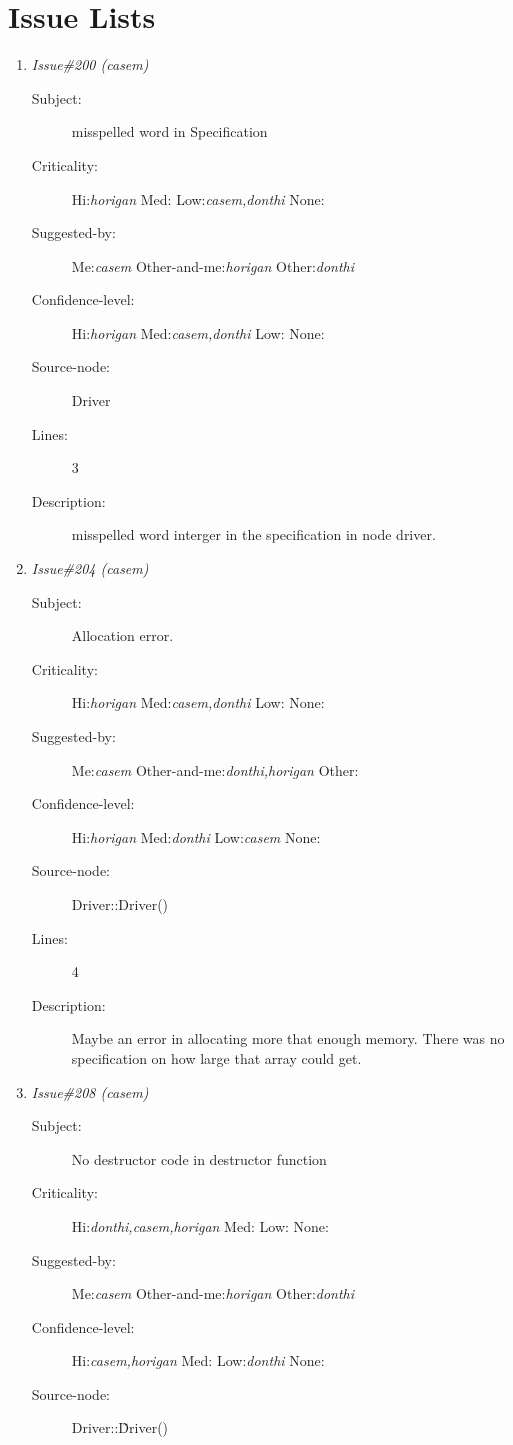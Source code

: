 \section{Issue Lists}
\begin{enumerate}
\item {\it Issue\#200 (casem)}
\begin{description}
\item [Subject:] misspelled word in Specification
\item [Criticality:] Hi:{\it horigan} Med:{\it } Low:{\it casem,donthi} None:{\it }
\item [Suggested-by:] Me:{\it casem} Other-and-me:{\it horigan} Other:{\it donthi}
\item [Confidence-level:] Hi:{\it horigan} Med:{\it casem,donthi} Low:{\it } None:{\it }
\item [Source-node:] Driver

\item [Lines:] 3

\item [Description:] misspelled word interger in the specification
in node driver.
\end{description}
\item {\it Issue\#204 (casem)}
\begin{description}
\item [Subject:] Allocation error.
\item [Criticality:] Hi:{\it horigan} Med:{\it casem,donthi} Low:{\it } None:{\it }
\item [Suggested-by:] Me:{\it casem} Other-and-me:{\it donthi,horigan} Other:{\it }
\item [Confidence-level:] Hi:{\it horigan} Med:{\it donthi} Low:{\it casem} None:{\it }
\item [Source-node:] Driver::Driver()

\item [Lines:] 4

\item [Description:] Maybe an error in allocating more that enough 
memory.  There was no specification on how large that array could get.
\end{description}
\item {\it Issue\#208 (casem)}
\begin{description}
\item [Subject:] No destructor code in destructor function
\item [Criticality:] Hi:{\it donthi,casem,horigan} Med:{\it } Low:{\it } None:{\it }
\item [Suggested-by:] Me:{\it casem} Other-and-me:{\it horigan} Other:{\it donthi}
\item [Confidence-level:] Hi:{\it casem,horigan} Med:{\it } Low:{\it donthi} None:{\it }
\item [Source-node:] Driver::\~Driver()


\end{description}
\end{enumerate}
